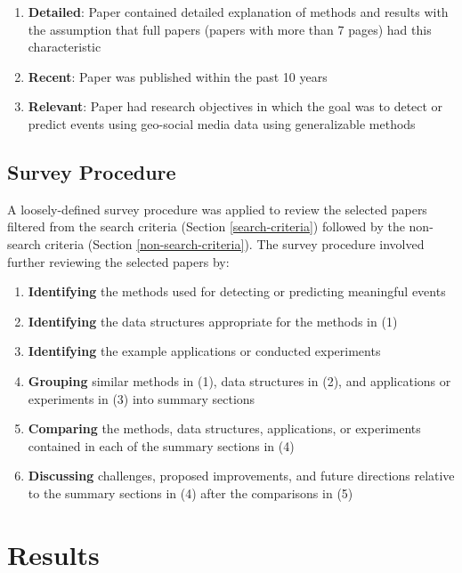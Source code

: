 \begin{enumerate}[label=(\alph*)]
  \item \textbf{Detailed}: Paper contained detailed explanation of methods and results with the assumption that full papers (papers with more than 7 pages) had this characteristic
  \item \textbf{Recent}: Paper was published within the past 10 years
  \item \textbf{Relevant}: Paper had research objectives in which the goal was to detect or predict events using geo-social media data using generalizable methods
\end{enumerate}

\subsection{Survey Procedure} \label{survey-procedure}

A loosely-defined survey procedure was applied to review the selected papers filtered from the search criteria (Section \ref{search-criteria}) followed by the non-search criteria (Section \ref{non-search-criteria}). The survey procedure involved further reviewing the selected papers by:

\begin{enumerate}[label=(\arabic*)]
  \item \textbf{Identifying} the methods used for detecting or predicting meaningful events
  \item \textbf{Identifying} the data structures appropriate for the methods in (1)
  \item \textbf{Identifying} the example applications or conducted experiments
  \item \textbf{Grouping} similar methods in (1), data structures in (2), and applications or experiments in (3) into summary sections
  \item \textbf{Comparing} the methods, data structures, applications, or experiments contained in each of the summary sections in (4)
  \item \textbf{Discussing} challenges, proposed improvements, and future directions relative to the summary sections in (4) after the comparisons in (5)
\end{enumerate}

\section{Results} \label{results}

